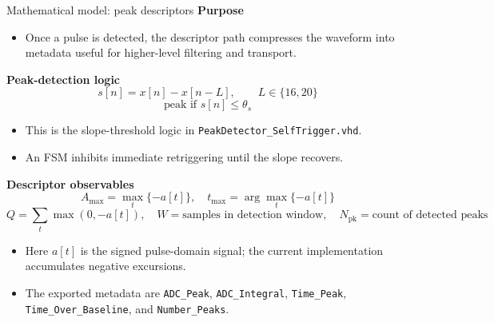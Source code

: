 \documentclass[aspectratio=169]{beamer}
\begin{document}
\begin{frame}{Mathematical model: peak descriptors}
\small
\textbf{Purpose}
\begin{itemize}
  \item Once a pulse is detected, the descriptor path compresses the waveform into metadata useful for higher-level filtering and transport.
\end{itemize}

\vspace{1mm}
\textbf{Peak-detection logic}
\[
s[n] = x[n] - x[n-L], \qquad L \in \{16,20\}
\]
\[
\text{peak if } s[n] \le \theta_s
\]

\begin{itemize}
  \item This is the slope-threshold logic in \texttt{PeakDetector\_SelfTrigger.vhd}.
  \item An FSM inhibits immediate retriggering until the slope recovers.
\end{itemize}

\vspace{1mm}
\textbf{Descriptor observables}
\[
A_{\max} = \max_t\{-a[t]\}, \quad
t_{\max} = \arg\max_t\{-a[t]\}
\]
\[
Q = \sum_t \max(0,-a[t]), \quad
W = \text{samples in detection window}, \quad
N_{\text{pk}} = \text{count of detected peaks}
\]

\begin{itemize}
  \item Here \(a[t]\) is the signed pulse-domain signal; the current implementation accumulates negative excursions.
  \item The exported metadata are \texttt{ADC\_Peak}, \texttt{ADC\_Integral}, \texttt{Time\_Peak}, \texttt{Time\_Over\_Baseline}, and \texttt{Number\_Peaks}.
\end{itemize}
\end{frame}
\end{document}
